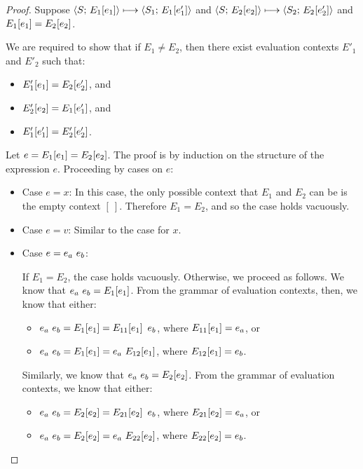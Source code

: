 \begin{proof}
  Suppose $\langle S;\, E_1\hspace{-0.5mm}\left[e_1\right] \rangle \longmapsto \langle S_1;\, E_1\hspace{-0.5mm}\left[e'_1\right] \rangle$ and
  $\langle S;\, E_2\hspace{-0.5mm}\left[e_2\right] \rangle \longmapsto
  \langle S_2;\, E_2\hspace{-0.5mm}\left[e'_2\right] \rangle$ and $E_1\hspace{-0.5mm}\left[e_1\right] =
  E_2\hspace{-0.5mm}\left[e_2\right]$.

  We are required to show that if $E_1 \neq E_2$, then there exist
  evaluation contexts $E'_1$ and $E'_2$ such that:
  \begin{itemize}
  \item $E'_1\hspace{-0.5mm}\left[e_1\right] = E_2\hspace{-0.5mm}\left[e'_2\right]$, and
  \item $E'_2\hspace{-0.5mm}\left[e_2\right] = E_1\hspace{-0.5mm}\left[e'_1\right]$, and
  \item $E'_1\hspace{-0.5mm}\left[e'_1\right] = E'_2\hspace{-0.5mm}\left[e'_2\right]$.
  \end{itemize}

  Let $e = E_1\hspace{-0.5mm}\left[e_1\right] = E_2\hspace{-0.5mm}\left[e_2\right]$.  The proof is
  by induction on the structure of the expression $e$.  Proceeding by
  cases on $e$:

  \begin{itemize}

    \item Case $e = x$: In this case, the only possible context that $E_1$
      and $E_2$ can be is the empty context $[~]$.  Therefore $E_1 =
      E_2$, and so the case holds vacuously.

    \item Case $e = v$: Similar to the case for $x$.

    \item Case $e = e_a~e_b$:

      If $E_1 = E_2$, the case holds vacuously.  Otherwise, we proceed
      as follows.  We know that $e_a~e_b =
      E_1\hspace{-0.5mm}\left[e_1\right]$.  From the grammar of evaluation contexts,
      then, we know that either:
      \begin{itemize}
        \item $e_a~e_b = E_1\hspace{-0.5mm}\left[e_1\right] = E_{11}\hspace{-0.5mm}\left[e_1\right]~e_b$, where $E_{11}\hspace{-0.5mm}\left[e_1\right] = e_a$, or
        \item $e_a~e_b = E_1\hspace{-0.5mm}\left[e_1\right] = e_a~E_{12}\hspace{-0.5mm}\left[e_1\right]$, where $E_{12}\hspace{-0.5mm}\left[e_1\right] = e_b$.
      \end{itemize}

      Similarly, we know that $e_a~e_b = E_2\hspace{-0.5mm}\left[e_2\right]$.  From the grammar of
      evaluation contexts, we know that either:
      \begin{itemize}
        \item $e_a~e_b = E_2\hspace{-0.5mm}\left[e_2\right] = E_{21}\hspace{-0.5mm}\left[e_2\right]~e_b$, where $E_{21}\hspace{-0.5mm}\left[e_2\right] = e_a$, or
        \item $e_a~e_b = E_2\hspace{-0.5mm}\left[e_2\right] = e_a~E_{22}\hspace{-0.5mm}\left[e_2\right]$, where $E_{22}\hspace{-0.5mm}\left[e_2\right] = e_b$.
      \end{itemize}


\end{itemize}
\end{proof}
